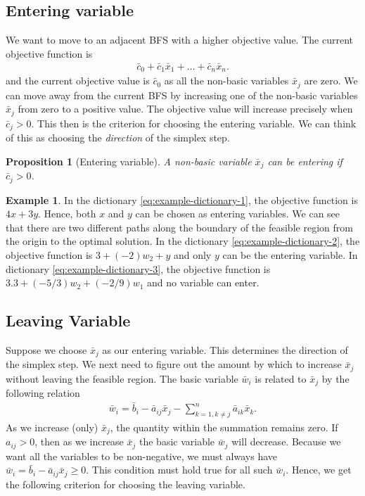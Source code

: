 \documentclass[
]{book}
\newtheorem{proposition}{Proposition}[chapter]
\theoremstyle{definition}
\theoremstyle{definition}
\newtheorem{example}{Example}[chapter]
\theoremstyle{definition}
\theoremstyle{definition}
\theoremstyle{remark}
\begin{document}
\hypertarget{entering-variable}{%
\subsection{Entering variable}\label{entering-variable}}

We want to move to an adjacent BFS with a higher objective value.
The current objective function is
\begin{align*}
  \bar{c}_0  +  \bar{c}_1\bar{x}_1  +  \dots  +  \bar{c}_n\bar{x}_n.
\end{align*}
and the current objective value is \(\bar{c}_0\) as all the non-basic variables \(\bar{x}_j\) are zero.
We can move away from the current BFS by increasing one of the non-basic variables \(\bar{x}_j\) from zero to a positive value. The objective value will increase precisely when \(\bar{c}_j > 0\). This then is the criterion for choosing the entering variable. We can think of this as choosing the \emph{direction} of the simplex step.

\begin{proposition}[Entering variable]
\protect\hypertarget{prp:entering-variable}{}\label{prp:entering-variable}A non-basic variable \(\bar{x}_j\) can be entering if \(\bar{c}_j > 0\).
\end{proposition}

\begin{example}
In the dictionary \eqref{eq:example-dictionary-1}, the objective function is \(4x + 3y\). Hence, both \(x\) and \(y\) can be chosen as entering variables. We can see that there are two different paths along the boundary of the feasible region from the origin to the optimal solution. In the dictionary \eqref{eq:example-dictionary-2}, the objective function is \(3 + (-2)w_2 + y\) and only \(y\) can be the entering variable. In dictionary \eqref{eq:example-dictionary-3}, the objective function is \(3.3 + (-5/3)w_2 + (-2/9)w_1\) and no variable can enter.
\end{example}

\hypertarget{leaving-variable}{%
\subsection{Leaving Variable}\label{leaving-variable}}

Suppose we choose \(\bar{x}_j\) as our entering variable.
This determines the direction of the simplex step.
We next need to figure out the amount by which to increase \(\bar{x}_j\) without leaving the feasible region.
The basic variable \(\bar{w}_i\) is related to \(\bar{x}_j\) by the following relation
\begin{align*}
  \bar{w}_i = \bar{b}_i - \bar{a}_{ij} \bar{x}_j - \sum \limits_{k = 1, k \neq j}^{n}  \bar{a}_{ik} \bar{x}_k.
\end{align*}
As we increase (only) \(\bar{x}_j\), the quantity within the summation remains zero.
If \(a_{ij} > 0\), then as we increase \(\bar{x}_j\) the basic variable \(\bar{w}_j\) will decrease.
Because we want all the variables to be non-negative, we must always have \(\bar{w}_i = \bar{b}_i - \bar{a}_{ij} \bar{x}_j \ge 0\).
This condition must hold true for all such \(\bar{w}_i\).
Hence, we get the following criterion for choosing the leaving variable.
\end{document}
